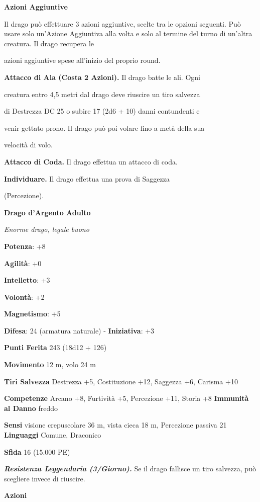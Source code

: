 \begin{multicols}{2}
\textbf{Azioni Aggiuntive}

Il drago può effettuare 3 azioni aggiuntive, scelte tra le opzioni  seguenti. Può usare solo un'Azione Aggiuntiva alla volta e solo  al termine del turno di un'altra creatura. Il drago recupera le

azioni aggiuntive spese all'inizio del proprio round.

\textbf{Attacco di Ala (Costa 2 Azioni).} Il drago batte le ali. Ogni

creatura entro 4,5 metri dal drago deve riuscire un tiro salvezza

di Destrezza DC 25 o subire 17 (2d6 + 10) danni contundenti e

venir gettato prono. Il drago può poi volare fino a metà della sua

velocità di volo.

\textbf{Attacco di Coda.} Il drago effettua un attacco di coda.

\textbf{Individuare.} Il drago effettua una prova di Saggezza

(Percezione).



\textbf{Drago d'Argento Adulto}

\emph{Enorme drago, legale buono}

\textbf{Potenza}: +8

\textbf{Agilità}: +0

\textbf{Intelletto}: +3

\textbf{Volontà}: +2

\textbf{Magnetismo}: +5

\textbf{Difesa}: 24 (armatura naturale) - \textbf{Iniziativa}: +3

\textbf{Punti Ferita} 243 (18d12 + 126)

\textbf{Movimento} 12 m, volo 24 m

\textbf{Tiri Salvezza} Destrezza +5, Costituzione +12, Saggezza +6,
Carisma +10

\textbf{Competenze} Arcano +8, Furtività +5, Percezione +11, Storia +8
\textbf{Immunità al Danno} freddo

\textbf{Sensi} visione crepuscolare 36 m, vista cieca 18 m, Percezione passiva
21 \textbf{Linguaggi} Comune, Draconico

\textbf{Sfida} 16 (15.000 PE)\smallskip

\emph{\textbf{Resistenza Leggendaria (3/Giorno).}} Se il drago fallisce
un tiro salvezza, può scegliere invece di riuscire.

\smallskip\textbf{Azioni}


\end{multicols}
